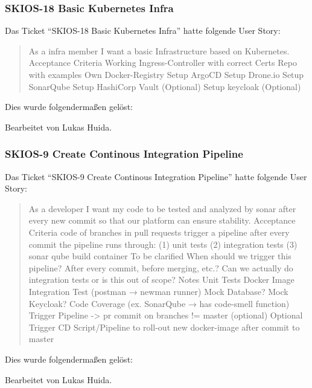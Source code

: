 \subsubsection{SKIOS-18 Basic Kubernetes Infra}
Das Ticket \enquote{SKIOS-18 Basic Kubernetes Infra} hatte folgende User Story:
\begin{quotation}
    As a infra member I want a basic Infrastructure based on Kubernetes.
    Acceptance Criteria
    Working Ingress-Controller with correct Certs
    Repo with examples
    Own Docker-Registry
    Setup ArgoCD
    Setup Drone.io
    Setup SonarQube
    Setup HashiCorp Vault (Optional)
    Setup keycloak (Optional)
\end{quotation}
Dies wurde folgendermaßen gelöst:
\begin{quotation}
    
\end{quotation}
Bearbeitet von Lukas Huida.

\subsubsection{SKIOS-9 Create Continous Integration Pipeline}
Das Ticket \enquote{SKIOS-9 Create Continous Integration Pipeline} hatte folgende User Story:
\begin{quotation}
    As a developer I want my code to be tested and analyzed by sonar after every new commit so that our platform can ensure stability.
    Acceptance Criteria
    code of branches in pull requests trigger a pipeline after every commit
    the pipeline runs through: (1) unit tests (2) integration tests (3) sonar qube
    build container
    To be clarified
    When should we trigger this pipeline? After every commit, before merging, etc.?
    Can we actually do integration tests or is this out of scope?
    Notes
    Unit Tests
    Docker Image
    Integration Test (postman → newman runner)
    Mock Database?
    Mock Keycloak?
    Code Coverage (ex. SonarQube → has code-smell function)
    Trigger Pipeline -> pr commit on branches != master (optional)
    Optional Trigger CD Script/Pipeline to roll-out new docker-image after commit to master
\end{quotation}
Dies wurde folgendermaßen gelöst:
\begin{quotation}
    
\end{quotation}
Bearbeitet von Lukas Huida.

